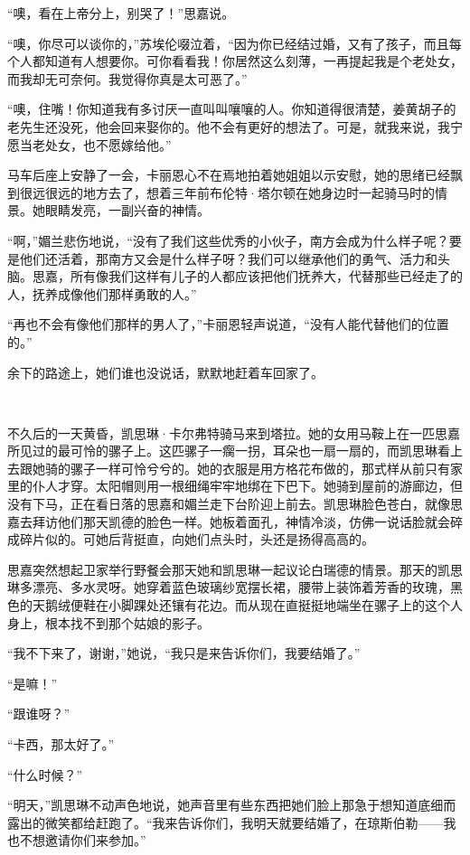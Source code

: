 \par “噢，看在上帝分上，别哭了！”思嘉说。
\par “噢，你尽可以谈你的，”苏埃伦啜泣着，“因为你已经结过婚，又有了孩子，而且每个人都知道有人想要你。可你看看我！你居然这么刻薄，一再提起我是个老处女，而我却无可奈何。我觉得你真是太可恶了。”
\par “噢，住嘴！你知道我有多讨厌一直叫叫嚷嚷的人。你知道得很清楚，姜黄胡子的老先生还没死，他会回来娶你的。他不会有更好的想法了。可是，就我来说，我宁愿当老处女，也不愿嫁给他。”
\par 马车后座上安静了一会，卡丽恩心不在焉地拍着她姐姐以示安慰，她的思绪已经飘到很远很远的地方去了，想着三年前布伦特·塔尔顿在她身边时一起骑马时的情景。她眼睛发亮，一副兴奋的神情。
\par “啊，”媚兰悲伤地说，“没有了我们这些优秀的小伙子，南方会成为什么样子呢？要是他们还活着，那南方又会是什么样子呀？我们可以继承他们的勇气、活力和头脑。思嘉，所有像我们这样有儿子的人都应该把他们抚养大，代替那些已经走了的人，抚养成像他们那样勇敢的人。”
\par “再也不会有像他们那样的男人了，”卡丽恩轻声说道，“没有人能代替他们的位置的。”
\par 余下的路途上，她们谁也没说话，默默地赶着车回家了。
\par  
\par 不久后的一天黄昏，凯思琳·卡尔弗特骑马来到塔拉。她的女用马鞍上在一匹思嘉所见过的最可怜的骡子上。这匹骡子一瘸一拐，耳朵也一扇一扇的，而凯思琳看上去跟她骑的骡子一样可怜兮兮的。她的衣服是用方格花布做的，那式样从前只有家里的仆人才穿。太阳帽则用一根细绳牢牢地绑在下巴下。她骑到屋前的游廊边，但没有下马，正在看日落的思嘉和媚兰走下台阶迎上前去。凯思琳脸色苍白，就像思嘉去拜访他们那天凯德的脸色一样。她板着面孔，神情冷淡，仿佛一说话脸就会碎成碎片似的。可她后背挺直，向她们点头时，头还是扬得高高的。
\par 思嘉突然想起卫家举行野餐会那天她和凯思琳一起议论白瑞德的情景。那天的凯思琳多漂亮、多水灵呀。她穿着蓝色玻璃纱宽摆长裙，腰带上装饰着芳香的玫瑰，黑色的天鹅绒便鞋在小脚踝处还镶有花边。而从现在直挺挺地端坐在骡子上的这个人身上，根本找不到那个姑娘的影子。
\par “我不下来了，谢谢，”她说，“我只是来告诉你们，我要结婚了。”
\par “是嘛！”
\par “跟谁呀？”
\par “卡西，那太好了。”
\par “什么时候？”
\par “明天，”凯思琳不动声色地说，她声音里有些东西把她们脸上那急于想知道底细而露出的微笑都给赶跑了。“我来告诉你们，我明天就要结婚了，在琼斯伯勒——我也不想邀请你们来参加。”
